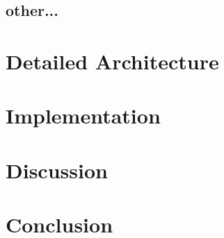 \subsection{other...} 

\section{Detailed Architecture}
\section{Implementation}
\section{Discussion}
\section{Conclusion}
















